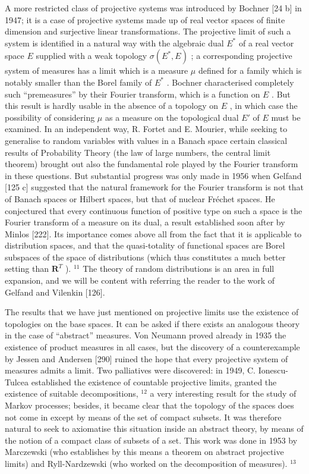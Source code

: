 A more restricted class of projective systems was introduced by Bochner {[}24 b{]} in 1947; it is a case of projective systems made up of real vector spaces of finite dimension and surjective linear transformations. The projective limit of such a system is identified in a natural way with the algebraic dual \(E^*\) of a real vector space \(E\) supplied with a weak topology \(\sigma(E^*, E)\) ; a corresponding projective system of measures has a limit which is a measure \(\mu\) defined for a family which is notably smaller than the Borel family of \(E^*\) . Bochner characterised completely such ``premeasures'' by their Fourier transform, which is a function on \(E\) . But this result is hardly usable in the absence of a topology on \(E\) , in which case the possibility of considering \(\mu\) as a measure on the topological dual \(E'\) of \(E\) must be examined. In an independent way, R. Fortet and E. Mourier, while seeking to generalise to random variables with values in a Banach space certain classical results of Probability Theory (the law of large numbers, the central limit theorem) brought out also the fundamental role played by the Fourier transform in these questions. But substantial progress was only made in 1956 when Gelfand {[}125 c{]} suggested that the natural framework for the Fourier transform is not that of Banach spaces or Hilbert spaces, but that of nuclear Fréchet spaces. He conjectured that every continuous function of positive type on such a space is the Fourier transform of a measure on its dual, a result established soon after by Minlos {[}222{]}. Its importance comes above all from the fact that it is applicable to distribution spaces, and that the quasi-totality of functional spaces are Borel subspaces of the space of distributions (which thus constitutes a much better setting than \(\mathbf{R}^T\) ). \(^{11}\) The theory of random distributions is an area in full expansion, and we will be content with referring the reader to the work of Gelfand and Vilenkin {[}126{]}.

The results that we have just mentioned on projective limits use the existence of topologies on the base spaces. It can be asked if there exists an analogous theory in the case of ``abstract'' measures. Von Neumann proved already in 1935 the existence of product measures in all cases, but the discovery of a counterexample by Jessen and Andersen {[}290{]} ruined the hope that every projective system of measures admits a limit. Two palliatives were discovered: in 1949, C. Ionescu-Tulcea established the existence of countable projective limits, granted the existence of suitable decompositions, \(^{12}\) a very interesting result for the study of Markov processes; besides, it became clear that the topology of the spaces does not come in except by means of the set of compact subsets. It was therefore natural to seek to axiomatise this situation inside an abstract theory, by means of the notion of a compact class of subsets of a set. This work was done in 1953 by Marczewski (who establishes by this means a theorem on abstract projective limits) and Ryll-Nardzewski (who worked on the decomposition of measures). \(^{13}\)

